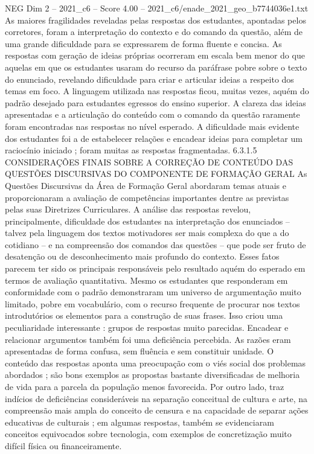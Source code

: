 \begin{textsample}{NEG Dim 2 – 2021\_c6 – Score 4.00 – 2021\_c6/enade\_2021\_geo\_b7744036e1.txt}
As maiores fragilidades reveladas pelas respostas dos estudantes, apontadas pelos corretores, foram a interpretação do contexto e do comando da questão, além de uma grande dificuldade para se expressarem de forma fluente e concisa.
As respostas com geração de ideias próprias ocorreram em escala bem menor do que aquelas em que os estudantes usaram do recurso da paráfrase pobre sobre o texto do enunciado, revelando dificuldade para criar e articular ideias a respeito dos temas em foco.
A linguagem utilizada nas respostas ficou, muitas vezes, aquém do padrão desejado para estudantes egressos do ensino superior.
A clareza das ideias apresentadas e a articulação do conteúdo com o comando da questão raramente foram encontradas nas respostas no nível esperado.
A dificuldade mais evidente dos estudantes foi a de estabelecer relações e encadear ideias para completar um raciocínio iniciado ; foram muitas as respostas fragmentadas. 6.3.1.5 CONSIDERAÇÕES FINAIS SOBRE A CORREÇÃO DE CONTEÚDO DAS QUESTÕES DISCURSIVAS DO COMPONENTE DE FORMAÇÃO GERAL As Questões Discursivas da Área de Formação Geral abordaram temas atuais e proporcionaram a avaliação de competências importantes dentre as previstas pelas suas Diretrizes Curriculares.
A análise das respostas revelou, principalmente, dificuldade dos estudantes na interpretação dos enunciados – talvez pela linguagem dos textos motivadores ser mais complexa do que a do cotidiano – e na compreensão dos comandos das questões – que pode ser fruto de desatenção ou de desconhecimento mais profundo do contexto.
Esses fatos parecem ter sido os principais responsáveis pelo resultado aquém do esperado em termos de avaliação quantitativa.
Mesmo os estudantes que responderam em conformidade com o padrão demonstraram um universo de argumentação muito limitado, pobre em vocabulário, com o recurso frequente de procurar nos textos introdutórios os elementos para a construção de suas frases.
Isso criou uma peculiaridade interessante : grupos de respostas muito parecidas.
Encadear e relacionar argumentos também foi uma deficiência percebida.
As razões eram apresentadas de forma confusa, sem fluência e sem constituir unidade.
O conteúdo das respostas aponta uma preocupação com o viés social dos problemas abordados ; são bons exemplos as propostas bastante diversificadas de melhoria de vida para a parcela da população menos favorecida.
Por outro lado, traz indícios de deficiências consideráveis na separação conceitual de cultura e arte, na compreensão mais ampla do conceito de censura e na capacidade de separar ações educativas de culturais ; em algumas respostas, também se evidenciaram conceitos equivocados sobre tecnologia, com exemplos de concretização muito difícil física ou financeiramente.

\end{textsample}
